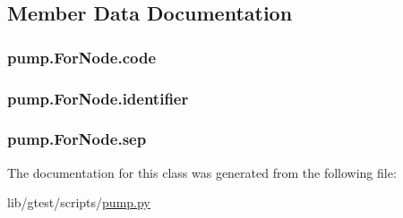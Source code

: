 \subsection{Member Data Documentation}
\hypertarget{classpump_1_1_for_node_afdb5f4f2a3bc772bbc6ea777dfde898e}{
\subsubsection[{code}]{\setlength{\rightskip}{0pt plus 5cm}pump.\-For\-Node.\-code}}\label{classpump_1_1_for_node_afdb5f4f2a3bc772bbc6ea777dfde898e}
\hypertarget{classpump_1_1_for_node_a2444199e135e43696b3a006bd0d38982}{
\subsubsection[{identifier}]{\setlength{\rightskip}{0pt plus 5cm}pump.\-For\-Node.\-identifier}}\label{classpump_1_1_for_node_a2444199e135e43696b3a006bd0d38982}
\hypertarget{classpump_1_1_for_node_a06b493278b3c1ad53363a2bcc3b8efb3}{
\subsubsection[{sep}]{\setlength{\rightskip}{0pt plus 5cm}pump.\-For\-Node.\-sep}}\label{classpump_1_1_for_node_a06b493278b3c1ad53363a2bcc3b8efb3}


The documentation for this class was generated from the following file\-:\begin{DoxyCompactItemize}
\item 
lib/gtest/scripts/\hyperlink{pump_8py}{pump.\-py}\end{DoxyCompactItemize}
